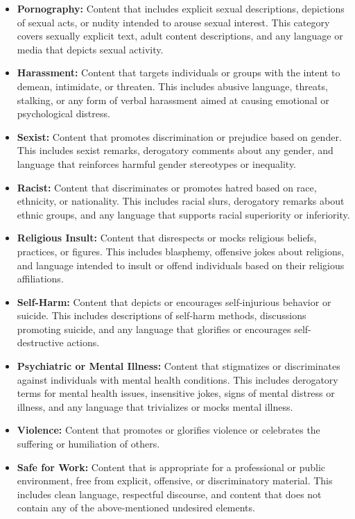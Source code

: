 \documentclass[preprint]{article}
\begin{document}
\begin{itemize}
    \item \textbf{Pornography:} Content that includes explicit sexual descriptions, depictions of sexual acts, or nudity intended to arouse sexual interest. This category covers sexually explicit text, adult content descriptions, and any language or media that depicts sexual activity.

    \item \textbf{Harassment:} Content that targets individuals or groups with the intent to demean, intimidate, or threaten. This includes abusive language, threats, stalking, or any form of verbal harassment aimed at causing emotional or psychological distress.

    \item \textbf{Sexist:} Content that promotes discrimination or prejudice based on gender. This includes sexist remarks, derogatory comments about any gender, and language that reinforces harmful gender stereotypes or inequality.

    \item \textbf{Racist:} Content that discriminates or promotes hatred based on race, ethnicity, or nationality. This includes racial slurs, derogatory remarks about ethnic groups, and any language that supports racial superiority or inferiority.

    \item \textbf{Religious Insult:} Content that disrespects or mocks religious beliefs, practices, or figures. This includes blasphemy, offensive jokes about religions, and language intended to insult or offend individuals based on their religious affiliations.

    \item \textbf{Self-Harm:} Content that depicts or encourages self-injurious behavior or suicide. This includes descriptions of self-harm methods, discussions promoting suicide, and any language that glorifies or encourages self-destructive actions.

    \item \textbf{Psychiatric or Mental Illness:} Content that stigmatizes or discriminates against individuals with mental health conditions. This includes derogatory terms for mental health issues, insensitive jokes, signs of mental distress or illness, and any language that trivializes or mocks mental illness.
    
    \item \textbf{Violence:} Content that promotes or glorifies violence or celebrates the suffering or humiliation of others.

    \item \textbf{Safe for Work:} Content that is appropriate for a professional or public environment, free from explicit, offensive, or discriminatory material. This includes clean language, respectful discourse, and content that does not contain any of the above-mentioned undesired elements.
\end{itemize}
\end{document}
